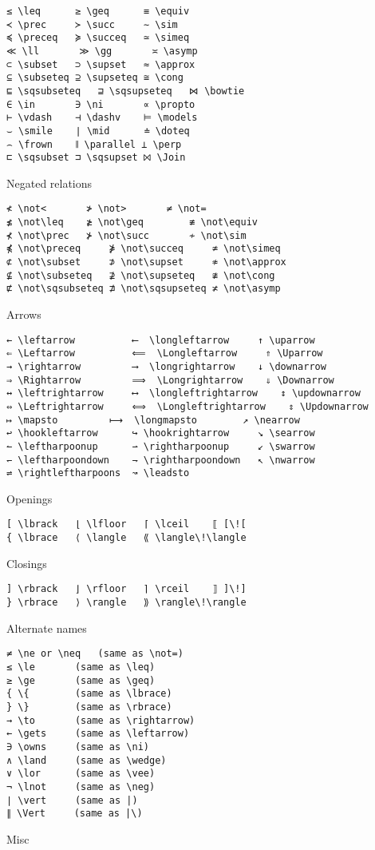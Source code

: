 \documentclass{article}
\begin{document}
\begin{verbatim}≤ \leq		≥ \geq		≡ \equiv
≺ \prec		≻ \succ		∼ \sim
≼ \preceq	≽ \succeq	≃ \simeq
≪ \ll		≫ \gg		≍ \asymp
⊂ \subset	⊃ \supset	≈ \approx
⊆ \subseteq	⊇ \supseteq	≅ \cong
⊑ \sqsubseteq	⊒ \sqsupseteq	⋈ \bowtie
∈ \in		∋ \ni		∝ \propto
⊢ \vdash	⊣ \dashv	⊨ \models
⌣ \smile	∣ \mid		≐ \doteq
⌢ \frown	∥ \parallel	⊥ \perp
⊏ \sqsubset	⊐ \sqsupset	⨝ \Join
\end{verbatim}
Negated relations

\begin{verbatim}≮ \not<		  ≯ \not>	    ≠ \not=
≰ \not\leq	  ≱ \not\geq	    ≢ \not\equiv
⊀ \not\prec	  ⊁ \not\succ	    ≁ \not\sim
⋠ \not\preceq	  ⋡ \not\succeq	    ≄ \not\simeq
⊄ \not\subset	  ⊅ \not\supset	    ≉ \not\approx
⊈ \not\subseteq	  ⊉ \not\supseteq   ≇ \not\cong
⋢ \not\sqsubseteq ⋣ \not\sqsupseteq ≭ \not\asymp
\end{verbatim}
Arrows

\begin{verbatim}← \leftarrow	      ⟵  \longleftarrow		↑ \uparrow
⇐ \Leftarrow	      ⟸  \Longleftarrow		⇑ \Uparrow
→ \rightarrow	      ⟶  \longrightarrow	↓ \downarrow
⇒ \Rightarrow	      ⟹  \Longrightarrow	⇓ \Downarrow
↔ \leftrightarrow     ⟷  \longleftrightarrow	↕ \updownarrow
⇔ \Leftrightarrow     ⟺  \Longleftrightarrow	⇕ \Updownarrow
↦ \mapsto	      ⟼  \longmapsto		↗ \nearrow
↩ \hookleftarrow      ↪ \hookrightarrow		↘ \searrow
↼ \leftharpoonup      ⇀ \rightharpoonup		↙ \swarrow
↽ \leftharpoondown    ⇁ \rightharpoondown	↖ \nwarrow
⇌ \rightleftharpoons  ↝ \leadsto
\end{verbatim}
Openings

\begin{verbatim}[ \lbrack	⌊ \lfloor	⌈ \lceil	⟦ [\![
{ \lbrace	⟨ \langle	⟪ \langle\!\langle
\end{verbatim}
Closings

\begin{verbatim}] \rbrack	⌋ \rfloor	⌉ \rceil	⟧ ]\!]
} \rbrace	⟩ \rangle	⟫ \rangle\!\rangle
\end{verbatim}
Alternate names

\begin{verbatim}≠ \ne or \neq	(same as \not=)
≤ \le		(same as \leq)
≥ \ge		(same as \geq)
{ \{		(same as \lbrace)
} \}		(same as \rbrace)
→ \to		(same as \rightarrow)
← \gets		(same as \leftarrow)
∋ \owns		(same as \ni)
∧ \land		(same as \wedge)
∨ \lor		(same as \vee)
¬ \lnot		(same as \neg)
∣ \vert		(same as |)
∥ \Vert		(same as |\)
\end{verbatim}
Misc
\end{document}
